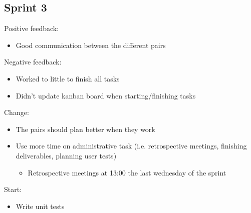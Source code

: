 \documentclass[a4paper,12pt]{article}
\begin{document}
 \subsection{Sprint 3}
 Positive feedback:
 \begin{itemize}
 	\item Good communication between the different pairs
 \end{itemize}
 Negative feedback:
 \begin{itemize}
 	\item Worked to little to finish all tasks
 	\item Didn't update kanban board when starting/finishing tasks
 \end{itemize}
 Change:
 \begin{itemize}
 	\item The pairs should plan better when they work
 	\item Use more time on administrative task (i.e. retrospective meetings, finishing deliverables, planning user tests)
 	\begin{itemize}
 		\item Retrospective meetings at 13:00 the last wednesday of the sprint
 	\end{itemize}
 \end{itemize}
 Start:
 \begin{itemize}
 	\item Write unit tests
 \end{itemize}
\end{document}
